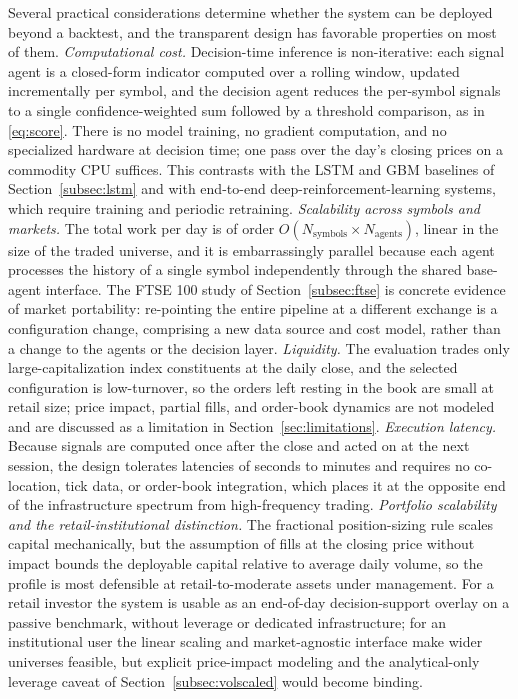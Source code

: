 \documentclass{ieeeaccess}
\begin{document}
Several practical considerations determine whether the system can be deployed beyond a backtest, and the transparent design has favorable properties on most of them. \emph{Computational cost.} Decision-time inference is non-iterative: each signal agent is a closed-form indicator computed over a rolling window, updated incrementally per symbol, and the decision agent reduces the per-symbol signals to a single confidence-weighted sum followed by a threshold comparison, as in \eqref{eq:score}. There is no model training, no gradient computation, and no specialized hardware at decision time; one pass over the day's closing prices on a commodity CPU suffices. This contrasts with the LSTM and GBM baselines of Section~\ref{subsec:lstm} and with end-to-end deep-reinforcement-learning systems, which require training and periodic retraining. \emph{Scalability across symbols and markets.} The total work per day is of order $O(N_\text{symbols} \times N_\text{agents})$, linear in the size of the traded universe, and it is embarrassingly parallel because each agent processes the history of a single symbol independently through the shared base-agent interface. The FTSE 100 study of Section~\ref{subsec:ftse} is concrete evidence of market portability: re-pointing the entire pipeline at a different exchange is a configuration change, comprising a new data source and cost model, rather than a change to the agents or the decision layer. \emph{Liquidity.} The evaluation trades only large-capitalization index constituents at the daily close, and the selected configuration is low-turnover, so the orders left resting in the book are small at retail size; price impact, partial fills, and order-book dynamics are not modeled and are discussed as a limitation in Section~\ref{sec:limitations}. \emph{Execution latency.} Because signals are computed once after the close and acted on at the next session, the design tolerates latencies of seconds to minutes and requires no co-location, tick data, or order-book integration, which places it at the opposite end of the infrastructure spectrum from high-frequency trading. \emph{Portfolio scalability and the retail-institutional distinction.} The fractional position-sizing rule scales capital mechanically, but the assumption of fills at the closing price without impact bounds the deployable capital relative to average daily volume, so the profile is most defensible at retail-to-moderate assets under management. For a retail investor the system is usable as an end-of-day decision-support overlay on a passive benchmark, without leverage or dedicated infrastructure; for an institutional user the linear scaling and market-agnostic interface make wider universes feasible, but explicit price-impact modeling and the analytical-only leverage caveat of Section~\ref{subsec:volscaled} would become binding.
\end{document}
